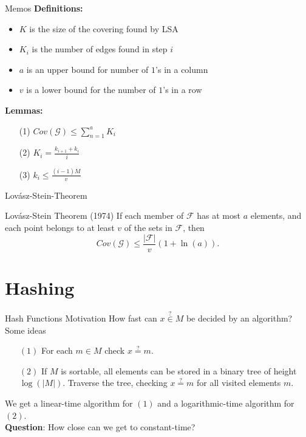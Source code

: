 \documentclass[10pt]{beamer}
\begin{document}
\begin{frame}[fragile]{Memos}
    \textbf{Definitions:}
    \begin{itemize}
        \item $ K $ is the size of the covering found by LSA \pause
        \item $ K_i $ is the number of edges found in step $ i $ \pause
        \item $ a $ is an upper bound for number of $ 1 $'s in a column \pause
        \item $ v $ is a lower bound for the number of $ 1 $'s in a row \pause
    \end{itemize}

    \textbf{Lemmas:}
    \begin{itemize}
        \item[(1)] $ Cov(\mathcal{G}) \leq \sum_{n=1}^a K_i$ \pause
        \item[(2)] $ K_i = \frac{k_{i+1} + k_i}{i} $ \pause
        \item[(3)] $ k_i \leq \frac{(i-1)M}{v}$
    \end{itemize}
\end{frame}



\begin{frame}[fragile]{Lovász-Stein-Theorem}
    \begin{block}{Lovász-Stein Theorem (1974)}
        If each member of $ \mathcal{F} $ has at most $ a $ elements,
        and each point belongs to at least $ v $ of the sets in $ \mathcal{F} $, then
        \[
            Cov(\mathcal{G}) \leq \frac{|\mathcal{F}|}{v}(1 + \ln(a)).
        \]
    \end{block}
\end{frame}

\section{Hashing}

\begin{frame}[fragile]{Hash Functions Motivation}
    How fast can $ x \stackrel{?}{\in} M $ be decided by an algorithm? \pause
    \\
    \vspace{1em}
    Some ideas
    \begin{itemize}
        \item[$ (1) $] For each $ m \in M $ check $ x \stackrel{?}{=} m $.\pause
        \item[$ (2) $] If $ M $ is sortable, all elements can be stored in a binary tree of height $ \log (|M|)$.
        Traverse the tree, checking $ x \stackrel{?}{=} m $ for all visited elements $ m $.\pause
    \end{itemize}
    We get a linear-time algorithm for $ (1) $ and a logarithmic-time algorithm for $ (2) $.\pause
    \\
    \vfill
    \textbf{Question}: How close can we get to constant-time?
\end{frame}
\end{document}
